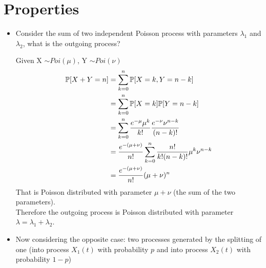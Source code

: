 \section{Properties}

\begin{itemize}
	\item Consider the sum of two independent Poisson process with parameters $\lambda_1$ and $\lambda_2$, what is the outgoing process?
		 \begin{figure}[H]
			\centering
		 \end{figure}
			Given X $\sim Poi(\mu)$, Y $\sim Poi(\nu)$
			\begin{equation}
			 \begin{split}
				  \mathbb{P}[X + Y = n] &= \sum\limits_{k=0}^n \mathbb{P}[X = k, Y = n - k] \\
				 &= \sum\limits_{k=0}^n \mathbb{P}[X = k] \mathbb{P}[Y = n - k] \\
				 &= \sum\limits_{k=0}^n \frac{e^{-\mu} \mu^k}{k!} \frac{e^{-\nu}\nu^{n-k}}{(n-k)!}\\
				 &= \frac{e^{-(\mu + \nu)}}{n!}\sum\limits_{k=0}^n \frac{n!}{k!(n-k)!}\mu^k\nu^{n-k}\\
				 &= \frac{e^{-(\mu + \nu)}}{n!}(\mu + \nu)^n
			  \end{split}
			 \end{equation}
			 That is Poisson distributed with parameter $\mu + \nu$ (the sum of the two parameters). \\
			 Therefore the outgoing process is Poisson distributed with parameter $\lambda = \lambda_1 + \lambda_2$.
	  \item Now considering the opposite case: two processes generated by the splitting of one (into process $X_1(t)$ with probability $p$ and into process $X_2(t)$ with probability $1-p$)
			 \begin{figure}[H]
					\centering
\end{figure}
\end{itemize}
